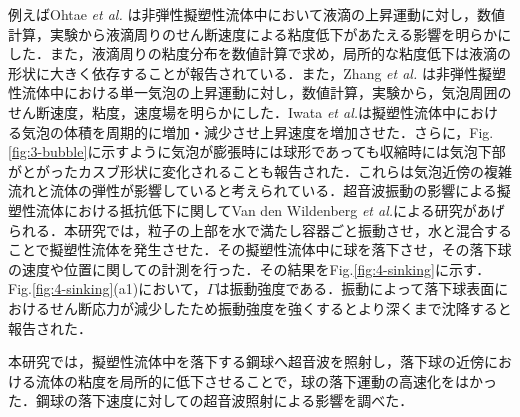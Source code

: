 例えばOhtae {\it et al.} \cite{ref:2}は非弾性擬塑性流体中において液滴の上昇運動に対し，数値計算，実験から液滴周りのせん断速度による粘度低下があたえる影響を明らかにした．また，液滴周りの粘度分布を数値計算で求め，局所的な粘度低下は液滴の形状に大きく依存することが報告されている\cite{ref:3}．また，Zhang {\it et al.} \cite{ref:4}は非弾性擬塑性流体中における単一気泡の上昇運動に対し，数値計算，実験から，気泡周囲のせん断速度，粘度，速度場を明らかにした．Iwata {\it et al.}\cite{ref:5}は擬塑性流体中における気泡の体積を周期的に増加・減少させ上昇速度を増加させた．さらに，Fig.\ref{fig:3-bubble}に示すように気泡が膨張時には球形であっても収縮時には気泡下部がとがったカスブ形状に変化されることも報告された．これらは気泡近傍の複雑流れと流体の弾性が影響していると考えられている．超音波振動の影響による擬塑性流体における抵抗低下に関してVan den Wildenberg {\it et al.}\cite{ref:6}による研究があげられる．本研究では，粒子の上部を水で満たし容器ごと振動させ，水と混合することで擬塑性流体を発生させた．その擬塑性流体中に球を落下させ，その落下球の速度や位置に関しての計測を行った．その結果をFig.\ref{fig:4-sinking}に示す．Fig.\ref{fig:4-sinking}(a1)において，$\Gamma$は振動強度である．振動によって落下球表面におけるせん断応力が減少したため振動強度を強くするとより深くまで沈降すると報告された．

本研究では，擬塑性流体中を落下する鋼球へ超音波を照射し，落下球の近傍における流体の粘度を局所的に低下させることで，球の落下運動の高速化をはかった．鋼球の落下速度に対しての超音波照射による影響を調べた．

